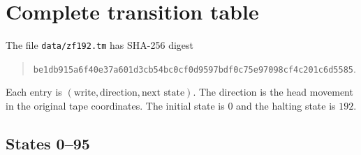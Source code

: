 \documentclass[11pt,letterpaper]{article}
\newcommand{\file}[1]{\nolinkurl{#1}}
\begin{document}
\clearpage
\section{Complete transition table}\label{app:table}

The file \file{data/zf192.tm} has SHA-256 digest
\begin{quote}\small
\file{be1db915a6f40e37a601d3cb54bc0cf0d9597bdf0c75e97098cf4c201c6d5585}.
\end{quote}

Each entry is $(\text{write},\text{direction},\text{next state})$.
The direction is the head movement in the original tape coordinates.
The initial state is $0$ and the halting state is $192$.

\subsection*{States 0--95}
\end{document}

